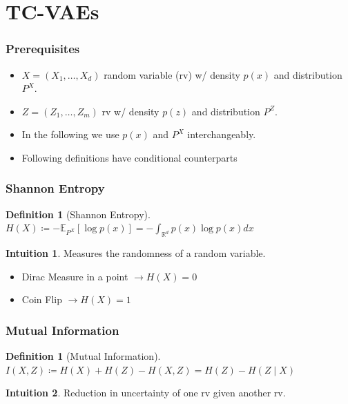 \documentclass{beamer}
\newcommand{\R}{\mathbb{R}}
\theoremstyle{definition}
\newtheorem{definition}[section]{Definition}
\newtheorem{intuition}{Intuition}
\begin{document}
    \section{TC-VAEs}
    \begin{frame}
      \frametitle{Prerequisites}
      \begin{itemize}
        \item $X = (X_{1}, \dots, X_{d})$ random variable (rv) w/ density $p(x)$ and distribution $P^{X}$.
        \item $Z = (Z_{1}, \dots, Z_{m})$ rv w/ density $p(z)$ and distribution $P^{Z}$.
        \item In the following we use $p(x)$ and $P^{X}$  interchangeably.
              \item Following definitions have conditional counterparts
      \end{itemize}
    \end{frame}

    \begin{frame}
      \frametitle{Shannon Entropy}
      \begin{definition}[Shannon Entropy]
        $H(X) \coloneqq -\mathbb{E}_{P^{X}}[\log p(x)] = -\int_{\R^{d}}p(x) \log p(x) dx$
      \end{definition}
      \begin{intuition}
       Measures the randomness of a random variable.
     \end{intuition}
     \begin{example}
       \begin{itemize}
         \item Dirac Measure in a point $\rightarrow H(X) = 0$
               \item Coin Flip $\rightarrow H(X) = 1$
       \end{itemize}
     \end{example}
    \end{frame}

    \begin{frame}
      \frametitle{Mutual Information}
      \begin{definition}[Mutual Information]
        $I(X, Z) \coloneqq H(X) + H(Z) - H(X, Z) = H(Z) - H(Z \mid X)$
      \end{definition}
      \begin{intuition}
        Reduction in uncertainty of one rv given another rv.
      \end{intuition}
    \end{frame}
\end{document}
